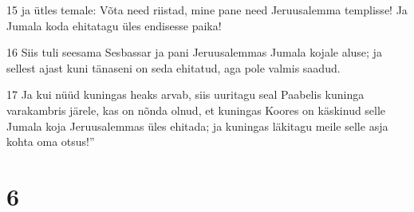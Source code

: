 \par 15 ja ütles temale: Võta need riistad, mine pane need Jeruusalemma templisse! Ja Jumala koda ehitatagu üles endisesse paika!
\par 16 Siis tuli seesama Sesbassar ja pani Jeruusalemmas Jumala kojale aluse; ja sellest ajast kuni tänaseni on seda ehitatud, aga pole valmis saadud.
\par 17 Ja kui nüüd kuningas heaks arvab, siis uuritagu seal Paabelis kuninga varakambris järele, kas on nõnda olnud, et kuningas Koores on käskinud selle Jumala koja Jeruusalemmas üles ehitada; ja kuningas läkitagu meile selle asja kohta oma otsus!”

\chapter{6}

